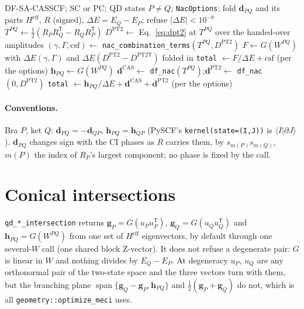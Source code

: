\documentclass[11pt]{article}
\newcommand{\code}[1]{\texttt{#1}}
\newcommand{\Heff}{H^{\mathrm{eff}}}
\newcommand{\T}{\mathsf T}
\begin{document}
\begin{algorithm}[htbp]
\caption{The QD-NEVPT2 derivative coupling (\code{qd\_sc\_nac}, \code{qd\_pc\_nac})}
\label{alg:nac}
\begin{algorithmic}[1]
\Require DF-SA-CASSCF; SC or PC; QD states $P\ne Q$; \code{NacOptions}; fold
\Ensure $\mathbf d_{PQ}$ and its parts
\State $\Heff$, $R$ (signed), $\Delta E = E_Q - E_P$; refuse $|\Delta E| < 10^{-8}$
\State $T^{PQ} \gets \tfrac12(R_PR_Q^\T - R_QR_P^\T)$ 
\State $D^{\mathrm{PT2}} \gets$ Eq.~\eqref{eq:dpt2} at $T^{PQ}$ over the handed-over amplitudes
  \State $(\gamma, \Gamma, \mathrm{csf}) \gets$ \code{nac\_combination\_terms}$(T^{PQ}, D^{\mathrm{PT2}})$
  \State $F \gets G(W^{PQ})$ with $\Delta E(\gamma, \Gamma)$ and $\Delta E(D^{\mathrm{PT2}} - D^{\mathrm{PT2}\T})$ folded in
  \State \code{total} $\gets F/\Delta E + \mathrm{csf}$ (per the options)
\Else
  \State $\mathbf h_{PQ} \gets G(W^{PQ})$
  \State $\mathbf d^{\mathrm{CAS}} \gets$ \code{df\_nac}$(T^{PQ})$;\quad $\mathbf d^{\mathrm{PT2}} \gets$ \code{df\_nac}$(0, D^{\mathrm{PT2}})$
  \State \code{total} $\gets \mathbf h_{PQ}/\Delta E + \mathbf d^{\mathrm{CAS}} + \mathbf d^{\mathrm{PT2}}$ (per the options)
\EndIf
\end{algorithmic}
\end{algorithm}

\paragraph{Conventions.} Bra $P$, ket $Q$: $\mathbf d_{PQ} = -\mathbf d_{QP}$,
$\mathbf h_{PQ} = \mathbf h_{QP}$ (PySCF's \code{kernel(state=(I,J))} is
$\langle I|\partial J\rangle$). $\mathbf d_{PQ}$ changes sign with the CI
phases as $R$ carries them, by $s_{m(P)}s_{m(Q)}$, $m(P)$ the index of $R_P$'s
largest component; no phase is fixed by the call.

\section{Conical intersections}
\label{sec:meci}

\code{qd\_*\_intersection} returns $\mathbf g_P = G(u_Pu_P^\T)$,
$\mathbf g_Q = G(u_Qu_Q^\T)$ and $\mathbf h_{PQ} = G(W^{PQ})$ from one set of
$\Heff$ eigenvectors, by default through one several-$W$ call (one shared
block Z-vector). It does not refuse a degenerate pair: $G$ is linear in $W$
and nothing divides by $E_Q - E_P$. At degeneracy $u_P$, $u_Q$ are any
orthonormal pair of the two-state space and the three vectors turn with
them, but the branching plane $\operatorname{span}\{\mathbf g_Q - \mathbf g_P,
\mathbf h_{PQ}\}$ and $\tfrac12(\mathbf g_P + \mathbf g_Q)$ do not, which is
all \code{geometry::optimize\_meci} uses.
\end{document}

